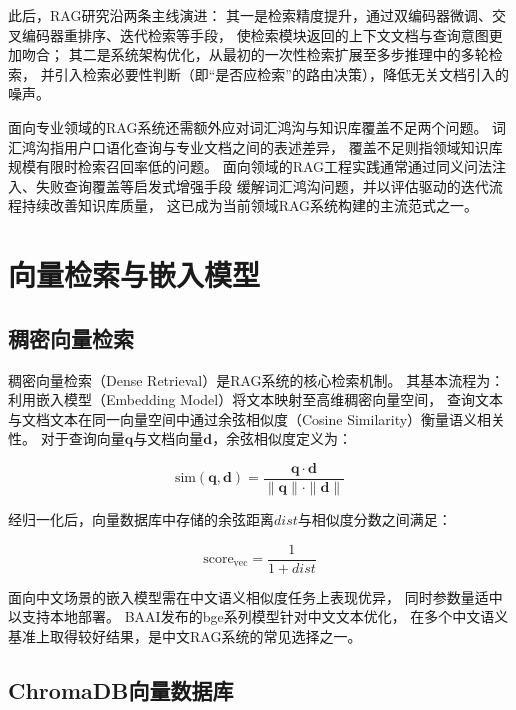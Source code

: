此后，RAG研究沿两条主线演进：
其一是检索精度提升，通过双编码器微调、交叉编码器重排序、迭代检索等手段，
使检索模块返回的上下文文档与查询意图更加吻合；
其二是系统架构优化，从最初的一次性检索扩展至多步推理中的多轮检索，
并引入检索必要性判断（即“是否应检索”的路由决策），降低无关文档引入的噪声。

面向专业领域的RAG系统还需额外应对词汇鸿沟与知识库覆盖不足两个问题。
词汇鸿沟指用户口语化查询与专业文档之间的表述差异，
覆盖不足则指领域知识库规模有限时检索召回率低的问题。
面向领域的RAG工程实践通常通过同义问法注入、失败查询覆盖等启发式增强手段
缓解词汇鸿沟问题，并以评估驱动的迭代流程持续改善知识库质量，
这已成为当前领域RAG系统构建的主流范式之一。

\section{向量检索与嵌入模型}

\subsection{稠密向量检索}

稠密向量检索（Dense Retrieval）是RAG系统的核心检索机制。
其基本流程为：利用嵌入模型（Embedding Model）将文本映射至高维稠密向量空间，
查询文本与文档文本在同一向量空间中通过余弦相似度（Cosine Similarity）衡量语义相关性。
对于查询向量$\boldsymbol{q}$与文档向量$\boldsymbol{d}$，余弦相似度定义为：

\begin{equation}
\text{sim}(\boldsymbol{q}, \boldsymbol{d}) = \frac{\boldsymbol{q} \cdot \boldsymbol{d}}{\|\boldsymbol{q}\| \cdot \|\boldsymbol{d}\|}
\end{equation}

经归一化后，向量数据库中存储的余弦距离$dist$与相似度分数之间满足：

\begin{equation}
\text{score}_\text{vec} = \frac{1}{1 + dist}
\end{equation}

面向中文场景的嵌入模型需在中文语义相似度任务上表现优异，
同时参数量适中以支持本地部署。
BAAI发布的bge系列模型针对中文文本优化，
在多个中文语义基准上取得较好结果，是中文RAG系统的常见选择之一。

\subsection{ChromaDB向量数据库}

